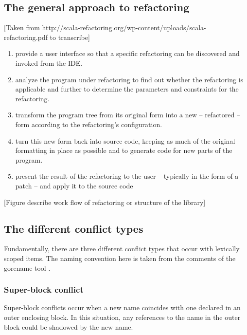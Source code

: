 
\subsection{The general approach to refactoring}
[Taken from http://scala-refactoring.org/wp-content/uploads/scala-refactoring.pdf to transcribe]
\begin{enumerate}
\item provide a user interface so that a specific refactoring can be discovered and
invoked from the IDE.
\item analyze the program under refactoring to find out whether the refactoring is
applicable  and  further  to  determine  the  parameters  and  constraints  for  the
refactoring.
\item transform the program tree from its original form into a new – refactored – form
according to the refactoring’s configuration.
\item turn this new form back into source code,  keeping as much of the original
formatting in place as possible and to generate code for new parts of the program.
\item present the result of the refactoring to the user – typically in the form of a patch –
and apply it to the source code
\end{enumerate}

[Figure describe work flow of refactoring or structure of the library]


\subsection{The different conflict types}
Fundamentally, there are three different conflict types that occur with lexically scoped items. The naming convention here is taken from the comments of the gorename tool \cite{gorename15}.

\subsubsection{Super-block conflict}
Super-block conflicts occur when a new name coincides with one declared in an outer enclosing block. In this situation, any references to the name in the outer block could be shadowed by the new name.

